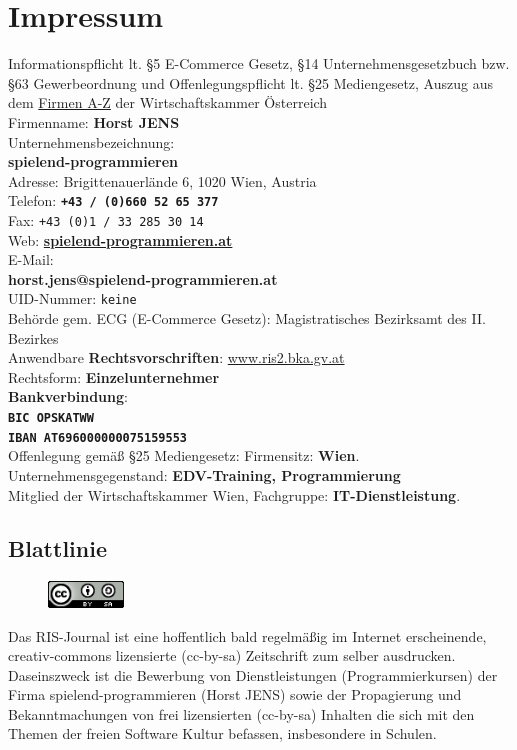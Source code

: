 \section*{Impressum} 
\label{impressum}
\footnotesize 
Informationspflicht lt. §5 E-Commerce Gesetz, §14 Unternehmensgesetzbuch bzw. §63 Gewerbeordnung und Offenlegungspflicht lt. §25 Mediengesetz, 
Auszug aus dem \href{http://www.wkoecg.at/Web/Ecg.aspx?FirmaID=27aeca80-2eac-430b-9aee-31eeaeea1fa9}{Firmen A-Z} der Wirtschaftskammer Österreich \\
Firmenname: \textbf{Horst JENS}\\ 
Unternehmensbezeichnung:\\
\textbf{spielend-programmieren}\\
Adresse: Brigittenauerlände 6, 1020 Wien, Austria\\
Telefon: \texttt{\textbf{+43 / (0)660 52 65 377}}\\
Fax: \texttt{+43 (0)1 / 33 285 30 14}\\
Web: \href{http://spielend-programmieren.at}{\textbf{spielend-programmieren.at}}\\
E-Mail:\\
\textbf{horst.jens@spielend-programmieren.at}\\
UID-Nummer: \texttt{keine}\\
Behörde gem. ECG (E-Commerce Gesetz): Magistratisches Bezirksamt des II. Bezirkes\\
Anwendbare \textbf{Rechtsvorschriften}:	\href{http://www.ris2.bka.gv.at}{www.ris2.bka.gv.at}\\
Rechtsform:	\textbf{Einzelunternehmer}\\
\textbf{Bankverbindung}: \\
\textbf{\texttt{BIC OPSKATWW} \\
\texttt{IBAN AT696000000075159553}} \\
Offenlegung gemäß §25 Mediengesetz: Firmensitz: \textbf{Wien}. 
Unternehmensgegenstand: \textbf{EDV-Training, Programmierung}\\
Mitglied der Wirtschaftskammer Wien, Fachgruppe: \textbf{IT-Dienstleistung}.

\subsection*{Blattlinie}
\begin{figure}
\includegraphics[width=2cm]{impressum/ccbysa88x31.png}
\end{figure}
Das RIS-Journal ist eine hoffentlich bald regelmäßig im Internet erscheinende, creativ-commons lizensierte (cc-by-sa) Zeitschrift zum selber ausdrucken. Daseinszweck ist die Bewerbung von Dienstleistungen (Programmierkursen) der Firma spielend-programmieren (Horst JENS) sowie der Propagierung und Bekanntmachungen von frei lizensierten (cc-by-sa) Inhalten die sich mit den Themen der freien Software Kultur befassen, insbesondere in Schulen. 

